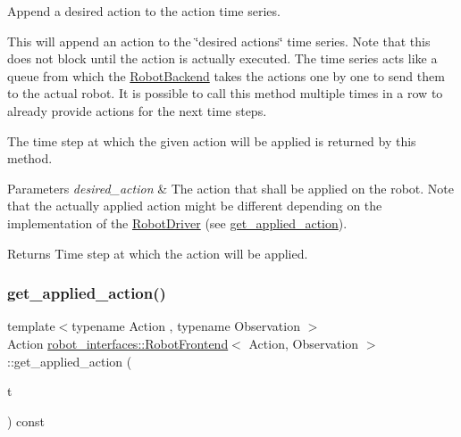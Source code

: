 Append a desired action to the action time series. 

This will append an action to the \char`\"{}desired actions\char`\"{} time series. Note that this does not block until the action is actually executed. The time series acts like a queue from which the \hyperlink{classrobot__interfaces_1_1RobotBackend}{Robot\+Backend} takes the actions one by one to send them to the actual robot. It is possible to call this method multiple times in a row to already provide actions for the next time steps.

The time step at which the given action will be applied is returned by this method.


\begin{DoxyParams}{Parameters}
{\em desired\+\_\+action} & The action that shall be applied on the robot. Note that the actually applied action might be different depending on the implementation of the \hyperlink{classrobot__interfaces_1_1RobotDriver}{Robot\+Driver} (see \hyperlink{classrobot__interfaces_1_1RobotFrontend_a870651d849fe0f1a4909820cc3b6de40}{get\+\_\+applied\+\_\+action}). \\
\hline
\end{DoxyParams}
\begin{DoxyReturn}{Returns}
Time step at which the action will be applied. 
\end{DoxyReturn}
\mbox{\label{classrobot__interfaces_1_1RobotFrontend_a870651d849fe0f1a4909820cc3b6de40}} 
\subsubsection{\texorpdfstring{get\+\_\+applied\+\_\+action()}{get\_applied\_action()}}
{\footnotesize\ttfamily template$<$typename Action , typename Observation $>$ \\
Action \hyperlink{classrobot__interfaces_1_1RobotFrontend}{robot\+\_\+interfaces\+::\+Robot\+Frontend}$<$ Action, Observation $>$\+::get\+\_\+applied\+\_\+action (\begin{DoxyParamCaption}\item[{const Time\+Index \&}]{t }\end{DoxyParamCaption}) const\hspace{0.3cm}{\ttfamily [inline]}}



